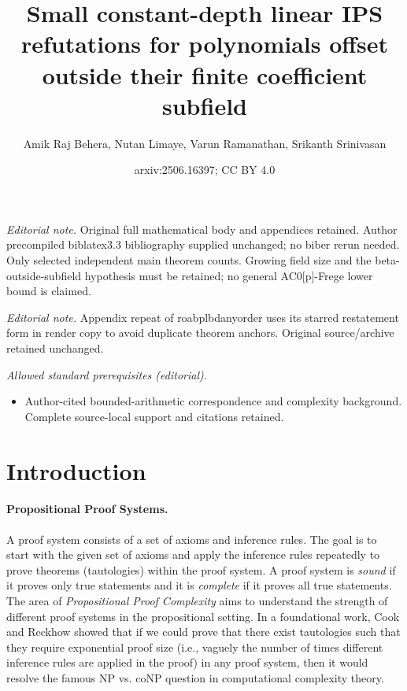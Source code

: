 \documentclass[11pt]{article}
\title{Small constant-depth linear IPS refutations for polynomials offset outside their finite coefficient subfield}
\author{Amik Raj Behera, Nutan Limaye, Varun Ramanathan, Srikanth Srinivasan}
\date{arxiv:2506.16397; CC BY 4.0}
\begin{document}
\maketitle
\noindent\textit{Editorial note.} Original full mathematical body and appendices retained. Author precompiled biblatex3.3 bibliography supplied unchanged; no biber rerun needed. Only selected independent main theorem counts. Growing field size and the beta-outside-subfield hypothesis must be retained; no general AC0[p]-Frege lower bound is claimed.\par\medskip
\noindent\textit{Editorial note.} Appendix repeat of roabplbdanyorder uses its starred restatement form in render copy to avoid duplicate theorem anchors. Original source/archive retained unchanged.\par\medskip
\noindent\textit{Allowed standard prerequisites (editorial).}\begin{itemize}
\item Author-cited bounded-arithmetic correspondence and complexity background. Complete source-local support and citations retained.
\end{itemize}\medskip
\section{Introduction}
\label{sec:intro}
\paragraph{Propositional Proof Systems.} A proof system consists of a set of axioms and inference rules. The goal is to start with the given set of axioms and apply the inference rules repeatedly to prove theorems (tautologies) within the proof system.  A proof system is \emph{sound} if it proves only true statements and it is \emph{complete} if it proves all true statements. The area of \emph{Propositional Proof Complexity} aims to understand the strength of different proof systems in the propositional setting. In a foundational work, Cook and Reckhow \cite{CR79} showed that if we could prove that there exist tautologies such that they require exponential proof size (i.e., vaguely the number of times different inference rules are applied in the proof) in any proof system, then it would resolve the famous NP vs. coNP question in computational complexity theory. 

\end{document}
